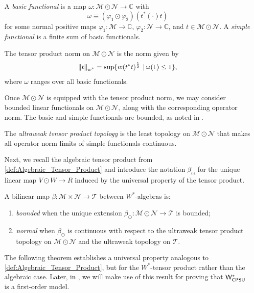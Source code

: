 \begin{definition}
  A \emph{basic functional} is a map $\omega: \mathscr{M} \odot \mathscr{N} \to \mathbb{C}$ with
\[
\omega \equiv (\varphi_1 \odot \varphi_2)(t^{*}(\cdot)t)
\]
for some normal positive maps $\varphi_1: \mathscr{M} \to \mathbb{C}$, $\varphi_2: \mathscr{N} \to \mathbb{C}$, and $t \in \mathscr{M} \odot \mathscr{N}$. A \emph{simple functional} is a finite sum of basic functionals.
\end{definition}

\begin{definition}
  The tensor product norm on $\mathscr{M} \odot \mathscr{N}$ is the norm  given by
\[
\left\lVert t \right\rVert_{\text{$w^*$}} = \sup \{ w(t^*t)^{\frac{1}{2}} \mid \omega(1) \leq 1 \},
\]
where $\omega$ ranges over all basic functionals.
\end{definition}


Once \( \mathscr{M} \odot \mathscr{N} \) is equipped with the tensor product norm, we may consider bounded linear functionals on $\mathscr{M} \odot \mathscr{N}$, along with the corresponding operator norm.  The basic and simple functionals are bounded, as noted in \cite[Definition 112 II (3)]{westerbaanCategoryNeumannAlgebras2019}.
\begin{definition}
The \emph{ultraweak tensor product topology} is the least topology on $\mathscr{M} \odot \mathscr{N}$
that makes all operator norm limits of simple functionals continuous.
\end{definition}

Next, we recall the algebraic tensor product from \autoref{def:Algebraic_Tensor_Product} and introduce the notation \( \beta_{\odot} \) for the unique linear map \( V \odot W \to R \) induced by the universal property of the tensor product.

A bilinear map $\beta\colon \mathscr{M}  \times \mathscr{N} \to \mathscr{T}$ between $W^*$-algebras is:
\begin{enumerate}
    \item \emph{bounded} when the unique extension $\beta_\odot\colon \mathscr{M} \odot \mathscr{N} \to \mathscr{T}$ is bounded;
    \item \emph{normal} when $\beta_\odot$ is continuous with respect to the ultraweak tensor product topology on $\mathscr{M} \odot \mathscr{N}$ and the ultraweak topology on $\mathscr{T}$.
\end{enumerate}


The following theorem establishes a universal property analogous to \autoref{def:Algebraic_Tensor_Product}, but for the $W^*$-tensor product rather than the algebraic case. Later, in ,  we will make use of this result for proving that $\mathsf{W^*_{CPSU}}$ is a first-order model.

